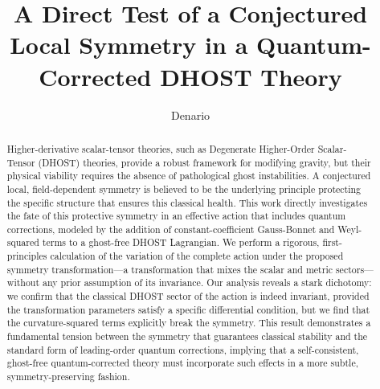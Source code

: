 \documentclass[twocolumn]{aastex631}
\begin{document}
\title{A Direct Test of a Conjectured Local Symmetry in a Quantum-Corrected DHOST Theory}

\author{Denario}

\begin{abstract}
Higher-derivative scalar-tensor theories, such as Degenerate Higher-Order Scalar-Tensor (DHOST) theories, provide a robust framework for modifying gravity, but their physical viability requires the absence of pathological ghost instabilities. A conjectured local, field-dependent symmetry is believed to be the underlying principle protecting the specific structure that ensures this classical health. This work directly investigates the fate of this protective symmetry in an effective action that includes quantum corrections, modeled by the addition of constant-coefficient Gauss-Bonnet and Weyl-squared terms to a ghost-free DHOST Lagrangian. We perform a rigorous, first-principles calculation of the variation of the complete action under the proposed symmetry transformation—a transformation that mixes the scalar and metric sectors—without any prior assumption of its invariance. Our analysis reveals a stark dichotomy: we confirm that the classical DHOST sector of the action is indeed invariant, provided the transformation parameters satisfy a specific differential condition, but we find that the curvature-squared terms explicitly break the symmetry. This result demonstrates a fundamental tension between the symmetry that guarantees classical stability and the standard form of leading-order quantum corrections, implying that a self-consistent, ghost-free quantum-corrected theory must incorporate such effects in a more subtle, symmetry-preserving fashion.
\end{abstract}

\end{document}
